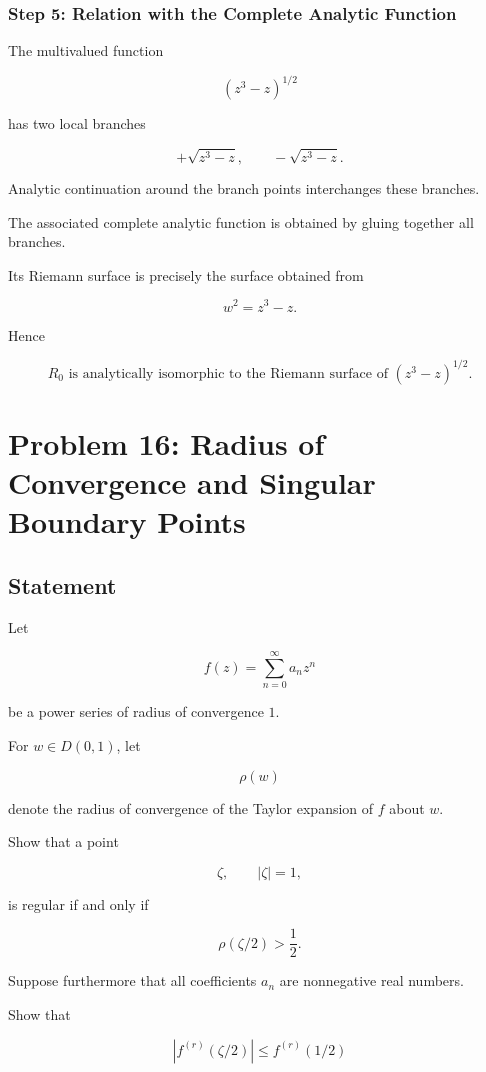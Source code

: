 \documentclass[12pt,a4paper]{article}
\theoremstyle{notespace}
\begin{document}
\subsubsection*{Step 5: Relation with the Complete Analytic Function}

The multivalued function

\[
(z^3-z)^{1/2}
\]

has two local branches

\[
+\sqrt{z^3-z},
\qquad
-\sqrt{z^3-z}.
\]

Analytic continuation around the branch points interchanges these branches.

The associated complete analytic function is obtained by gluing together all branches.

Its Riemann surface is precisely the surface obtained from

\[
w^2=z^3-z.
\]

Hence

\[
\boxed{
	R_0
	\text{ is analytically isomorphic to the Riemann surface of }
	(z^3-z)^{1/2}.
}
\]

\bigskip

\section{Problem 16: Radius of Convergence and Singular Boundary Points}

\subsection*{Statement}

Let

\[
f(z)=\sum_{n=0}^{\infty}a_n z^n
\]

be a power series of radius of convergence \(1\).

For \(w\in D(0,1)\), let

\[
\rho(w)
\]

denote the radius of convergence of the Taylor expansion of \(f\) about \(w\).

Show that a point

\[
\zeta,
\qquad
|\zeta|=1,
\]

is regular if and only if

\[
\rho(\zeta/2)>\frac12.
\]

Suppose furthermore that all coefficients \(a_n\) are nonnegative real numbers.

Show that

\[
|f^{(r)}(\zeta/2)|
\le
f^{(r)}(1/2)
\]
\end{document}
